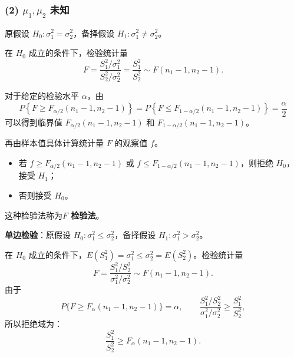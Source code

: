 \documentclass[11pt,a4paper]{report}
\theoremstyle{definition}
\begin{document}
\subsubsection*{(2) $\mu_{1},\mu_{2}$ 未知}

原假设 $H_{0}\colon\sigma_{1}^{2}=\sigma_{2}^{2}$，备择假设 $H_{1}\colon\sigma_{1}^{2}\neq\sigma_{2}^{2}$。

在 $H_{0}$ 成立的条件下，检验统计量
\[
F=\frac{S_{1}^{2}/\sigma_{1}^{2}}{S_{2}^{2}/\sigma_{2}^{2}}=\frac{S_{1}^{2}}{S_{2}^{2}}\sim F(n_{1}-1,n_{2}-1).
\]

对于给定的检验水平 $\alpha$，由
\[
P\left\{F\geq F_{\alpha/2}(n_{1}-1,n_{2}-1)\right\}=P\left\{F\leq F_{1-\alpha/2}(n_{1}-1,n_{2}-1)\right\}=\frac{\alpha}{2}
\]
可以得到临界值 $F_{\alpha/2}(n_{1}-1,n_{2}-1)$ 和 $F_{1-\alpha/2}(n_{1}-1,n_{2}-1)$。

再由样本值具体计算统计量 $F$ 的观察值 $f$。
\begin{itemize}[leftmargin=2em]
    \item 若 $f\geq F_{\alpha/2}(n_{1}-1,n_{2}-1)$ 或 $f\leq F_{1-\alpha/2}(n_{1}-1,n_{2}-1)$，则拒绝 $H_{0}$，接受 $H_{1}$；
    \item 否则接受 $H_{0}$。
\end{itemize}
这种检验法称为\textbf{$F$ 检验法}。

\textbf{单边检验}：原假设 $H_{0}\colon\sigma_{1}^{2}\leq\sigma_{2}^{2}$，备择假设 $H_{1}\colon\sigma_{1}^{2}>\sigma_{2}^{2}$。

在 $H_{0}$ 成立的条件下，$E(S_{1}^{2})=\sigma_{1}^{2}\leq\sigma_{2}^{2}=E(S_{2}^{2})$。检验统计量
\[
F=\frac{S_{1}^{2}/S_{2}^{2}}{\sigma_{1}^{2}/\sigma_{2}^{2}}\sim F(n_{1}-1,n_{2}-1).
\]
由于
\[
P\{F\geq F_{\alpha}(n_{1}-1,n_{2}-1)\}=\alpha,\qquad \frac{S_{1}^{2}/S_{2}^{2}}{\sigma_{1}^{2}/\sigma_{2}^{2}}\geq\frac{S_{1}^{2}}{S_{2}^{2}},
\]
所以拒绝域为：
\[
\frac{S_{1}^{2}}{S_{2}^{2}}\geq F_{\alpha}(n_{1}-1,n_{2}-1).
\]
\end{document}
